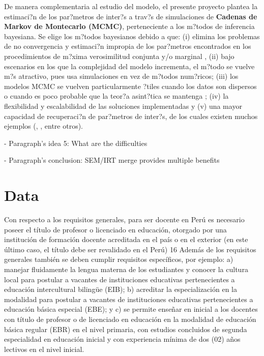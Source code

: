 De manera complementaria al estudio del modelo, el presente proyecto plantea la estimaci?n de los par?metros de inter?s a trav?s de simulaciones de \textbf{Cadenas de Markov de Montecarlo (MCMC)}, perteneciente a los m?todos de inferencia bayesiana. Se elige los m?todos bayesianos debido a que: (i) elimina los problemas de no convergencia y estimaci?n impropia de los par?metros encontrados en los procedimientos de m?xima verosimilitud conjunta y/o marginal \citep{Ham_Swam_Rog1991}, (ii) bajo escenarios en los que la complejidad del modelo incrementa, el m?todo se vuelve m?s atractivo, pues usa simulaciones en vez de m?todos num?ricos; (iii) los modelos MCMC se vuelven particularmente ?tiles cuando los datos son dispersos o cuando es poco probable que la teor?a asint?tica se mantenga \citep{Fox2010}; (iv) la flexibilidad y escalabilidad de las soluciones implementadas y (v) una mayor capacidad de recuperaci?n de par?metros de inter?s, de los cuales existen muchos ejemplos (\citealp{Hsi_Proc_Hou_Teo2010}, \citealp{Tarazona2013}, entre otros).


- Paragraph's idea 5: What are the difficulties


- Paragraph's conclusion: SEM/IRT merge provides multiple benefits




\section{Data}

Con respecto a los requisitos generales, para ser docente en Perú es necesario poseer el título de profesor o licenciado en educación, otorgado por una institución de formación docente acreditada en el país o en el exterior (en este último caso, el título debe ser revalidado en el Perú) 16 Además de los requisitos generales también se deben cumplir requisitos específicos, por ejemplo: a) manejar fluidamente la lengua materna de los estudiantes y conocer la cultura local para postular a vacantes de instituciones educativas pertenecientes a educación intercultural bilingüe (EIB); b) acreditar la especialización en la modalidad para postular a vacantes de instituciones educativas pertenecientes a educación básica especial (EBE); y c) se permite enseñar en inicial a los docentes con título de profesor o de licenciado en educación en la modalidad de educación básica regular (EBR) en el nivel primaria, con estudios concluidos de segunda especialidad en educación inicial y con experiencia mínima de dos (02) años lectivos en el nivel inicial.


